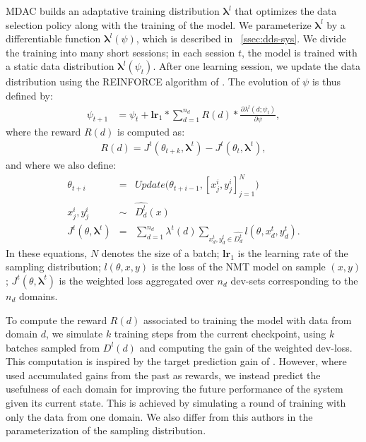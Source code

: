 \documentclass[11pt]{article}
\newcommand{\fyTodo}[1]{\Todo[FY:]{\textcolor{orange}{#1}}}
\newcommand{\vlambda}{\ensuremath{\boldsymbol\lambda}\xspace} %
\begin{document}
MDAC builds an adaptative training distribution $\vlambda^{l}$ that optimizes the data selection policy along with the training of the model. We parameterize $\vlambda^{l}$ by a differentiable function $\vlambda^l(\psi)$, which is described in \textsection~\ref{ssec:dds-sys}. We divide the training into many short sessions; in each session $t$, the model is trained with a static data distribution $\vlambda^{l}(\psi_t)$. After one learning session, we update the data distribution using the REINFORCE algorithm of . The evolution of $\psi$ is thus defined by:\fyTodo{$t$ is both for time, and for test - change into $\tau$?}
\begin{align*}
\psi_{t+1} &= \psi_t + \mathbf{lr}_{1} * \displaystyle{\mathop{\sum}_{d=1}^{n_d}} R(d) * \frac{\partial \lambda^l(d;\psi_t)}{\partial \psi},
\end{align*}
\begingroup
\allowdisplaybreaks
where the reward $R(d)$ is computed as:
\begin{align}
  R(d) = J^t(\theta_{t+k},\vlambda^t) - J^t(\theta_t,\vlambda^t), \label{eq:reward}
\end{align}
and where we also define:
\begin{equation}
\begin{array}{rcl}
\theta_{t+i} &=& Update\big(\theta_{t+i-1},[x^i_j,y^i_j]_{j=1}^N\big) \\ \nonumber
x^i_j, y^i_j &\sim& \widehat{D^l_d}(x) \\
J^t(\theta,\vlambda^t) &=& \displaystyle{\mathop{\sum}_{d=1}^{n_d}}\lambda^t(d)\displaystyle{\mathop{\sum}_{x^t_d,y^t_d \in \widehat{D^t_d}}} l(\theta,x^t_d,y^t_d).
\end{array}
\end{equation}
\endgroup
In these equations, $N$ denotes the size of a batch; $\mathbf{lr}_{1}$ is the learning rate of the sampling distribution; $l(\theta,x,y)$ is the loss of the NMT model on sample $(x,y)$; $J^t(\theta,\vlambda^t)$ is the weighted loss aggregated over $n_d$ dev-sets corresponding to the $n_d$ domains.

To compute the reward $R(d)$ associated to training the model with data from domain $d$, we simulate $k$ training steps from the current checkpoint, using $k$ batches sampled from $D^l(d)$ and computing the gain of the weighted dev-loss. This computation is inspired by the target prediction gain of . However, where  used accumulated gains from the past as rewards, we instead predict the usefulness of each domain for improving the future performance of the system given its current state. This is achieved by simulating a round of training with only the data from one domain. We also differ from this authors in the parameterization of the sampling distribution.
\end{document}
